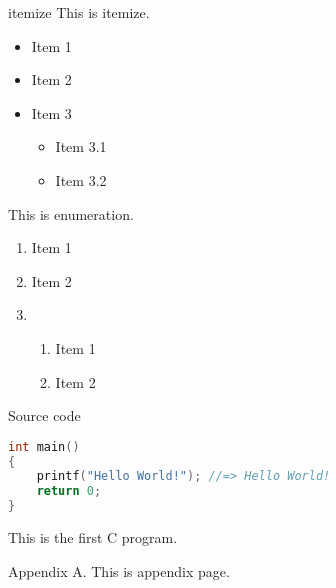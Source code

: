 \begin{frame}{itemize}
    This is itemize.
    \begin{itemize}
      \item Item 1
      \item Item 2
      \item Item 3
            \begin{itemize}
              \item Item 3.1
              \item Item 3.2
            \end{itemize}
    \end{itemize}

    This is enumeration.
    \begin{enumerate}
      \item Item 1
      \item Item 2
      \item \begin{enumerate}
        \item Item 1
        \item Item 2
      \end{enumerate}
    \end{enumerate}
\end{frame}

\begin{frame}[fragile]{Source code}

\begin{lstlisting}[caption=First C example,language=C]
int main()
{
    printf("Hello World!"); //=> Hello World!
    return 0;
}
\end{lstlisting}

This is the first C program.
\end{frame}

\beginappendix{} %

\begin{frame}{Appendix A.}
  This is appendix page.
\end{frame}

%  
